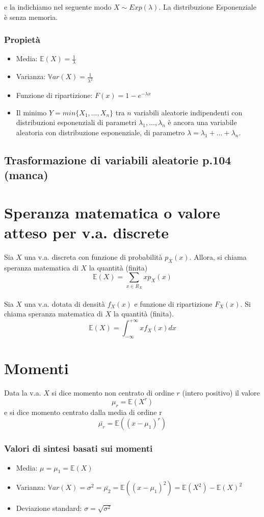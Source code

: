 \documentclass[a4paper]{report}
\begin{document}
  e la indichiamo nel seguente modo $X \sim Exp(\lambda)$. La distribuzione Esponenziale è senza memoria.
  \subsubsection{Propietà}
  \begin{itemize}
    \item Media: $\mathbb{E}(X) = \frac{1}{\lambda}$
    \item Varianza: $\mathbb{V}ar(X) = \frac{1}{\lambda^2}$
    \item Funzione di ripartizione: $F(x) = 1-e^{-\lambda x}$
    \item Il minimo $Y = min\{X_1,\dots,X_n\} $ tra $n$ variabili aleatorie indipendenti con distribuzioni esponenziali di parametri $ \lambda_1,\dots,\lambda_n $ è ancora una variabile aleatoria con distribuzione esponenziale, di parametro $ \lambda = \lambda_1 + \dots + \lambda_n$.
  \end{itemize}


  \subsection{Trasformazione di variabili aleatorie p.104 (manca)}

  \section{Speranza matematica o valore atteso per v.a. discrete}
  Sia $X$ una v.a. discreta con funzione di probabilità $p_X(x)$. Allora, si chiama speranza matematica di $X$ la quantità (finita)
  \[ \mathbb{E}(X) = \sum_{x \in R_X} x p_X(x) \]\\

  Sia $X$ una v.a. dotata di densità $f_X(x)$ e funzione di ripartizione $F_X(x)$. Si chiama speranza matematica di $X$ la quantità (finita).
  \[ \mathbb{E}(X) = \int_{-\infty}^{+\infty} x f_X(x) dx \]

  \section{Momenti}
  Data la v.a. $X$ si dice momento non centrato di ordine $r$ (intero positivo) il valore
  \[ \mu_r = \mathbb{E}(X^r)\]
  e si dice momento centrato dalla media di ordine r
  \[ \bar{\mu_r} = \mathbb{E}((x-\mu_1)^r)  \]

  \subsubsection{Valori di sintesi basati sui momenti}
  \begin{itemize}
    \item Media: $ \mu = \mu_1 = \mathbb{E}(X) $
    \item Varianza: $ \mathbb{V}ar(X) = \sigma^2 = \bar{\mu_2} = \mathbb{E}((x-\mu_1)^2) = \mathbb{E}(X^2) - \mathbb{E}(X)^2 $
    \item Deviazione standard: $ \sigma = \sqrt{\sigma^2} $
  \end{itemize}
\end{document}
